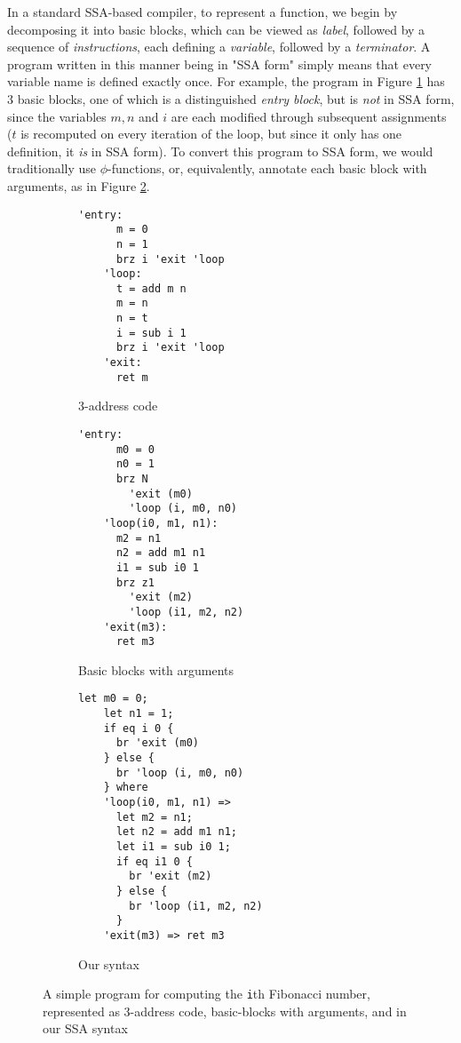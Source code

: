 \documentclass[acmsmall,screen,review]{acmart}
\begin{document}
In a standard SSA-based compiler, to represent a function, we begin by
decomposing it into basic blocks, which can be viewed as \textit{label},
followed by a sequence of \textit{instructions}, each defining a
\textit{variable}, followed by a \textit{terminator}. A program written in this
manner being in "SSA form" simply means that every variable name is defined
exactly once. For example, the program in Figure \ref{fig:3-addr} has 3 basic blocks, one of which is a distinguished \textit{entry block}, but is \textit{not} in SSA form, since the variables \(m, n\) and \(i\) are each modified through subsequent assignments (\(t\) is recomputed on every iteration of the loop, but since it only has one definition, it \textit{is} in SSA form). To convert this program to SSA form, we would traditionally use \(\phi\)-functions, or, equivalently, annotate each basic block with arguments, as in Figure \ref{fig:bb-arg}.

\begin{figure}
  \centering
  \begin{subfigure}[t]{0.33\textwidth}
    \begin{BVerbatim}[baseline=t, gobble=3]
    'entry:
      m = 0
      n = 1
      brz i 'exit 'loop
    'loop:
      t = add m n
      m = n
      n = t
      i = sub i 1
      brz i 'exit 'loop
    'exit:
      ret m
    \end{BVerbatim}
    \caption{3-address code}
    \label{fig:3-addr}
  \end{subfigure}
  \begin{subfigure}[t]{0.32\textwidth}
    \begin{BVerbatim}[baseline=t, gobble=3]
      'entry:
      m0 = 0
      n0 = 1
      brz N 
        'exit (m0) 
        'loop (i, m0, n0)
    'loop(i0, m1, n1):
      m2 = n1
      n2 = add m1 n1
      i1 = sub i0 1
      brz z1 
        'exit (m2) 
        'loop (i1, m2, n2)
    'exit(m3):
      ret m3
    \end{BVerbatim}
    \caption{Basic blocks with arguments}
    \label{fig:bb-arg}
  \end{subfigure}
  \begin{subfigure}[t]{0.33\textwidth}
    \begin{BVerbatim}[baseline=t, gobble=3]
    let m0 = 0;
    let n1 = 1;
    if eq i 0 {
      br 'exit (m0)
    } else {
      br 'loop (i, m0, n0)
    } where
    'loop(i0, m1, n1) =>
      let m2 = n1;
      let n2 = add m1 n1;
      let i1 = sub i0 1;
      if eq i1 0 {
        br 'exit (m2)
      } else {
        br 'loop (i1, m2, n2)
      }
    'exit(m3) => ret m3
    \end{BVerbatim}
    \caption{Our syntax}
    \label{fig:our-syn}
  \end{subfigure}
  \caption{A simple program for computing the \texttt{i}th Fibonacci number,
  represented as 3-address code, basic-blocks with arguments, and in our SSA
  syntax} 
  \Description{}
  \label{fig:ssa-examples}
\end{figure}
\end{document}
